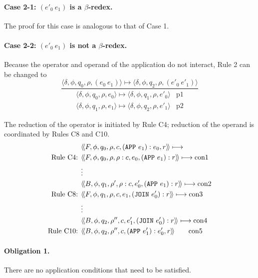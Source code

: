 \paragraph{Case 2-1: \((e'_0\ e_1)\) is a \(\beta\)-redex.}
The proof for this case is analogous to that of Case 1.


\paragraph{Case 2-2: \((e'_0\ e_1)\) is not a \(\beta\)-redex.}
Because the operator and operand of the application do not interact, Rule 2 can
be changed to
\[
\frac{
  \langle \delta,\phi,q_0,\rho,(e_0\ e_1)\rangle
  \longmapsto
  \langle \delta,\phi,q_2,\rho,(e'_0\ e'_1)\rangle
}{
  \begin{array}{ll}
  \langle \delta,\phi,q_0,\rho,e_0\rangle
  \longmapsto
  \langle \delta,\phi,q_1,\rho,e'_0\rangle
  & \mathrm{p1}\\
  \langle \delta,\phi,q_1,\rho,e_1\rangle
  \longmapsto
  \langle \delta,\phi,q_2,\rho,e'_1\rangle
  & \mathrm{p2}
  \end{array}
}
\]

The reduction of the operator is initiated by Rule C4; reduction of the operand
is coordinated by Rules C8 and C10.
\begin{align*}
&\langle\!\langle F,\phi,q_0,\rho,c,(\THOR{APP}\ e_1):e_0,r\rangle\!\rangle
\longmapsto\\
\text{Rule C4: }&
\langle\!\langle F,\phi,q_0,\rho,\rho:c,e_0,(\THOR{APP}\ e_1):r\rangle\!\rangle
\longmapsto \mathrm{con1}\\
&\vdots\\
&\langle\!\langle B,\phi,q_1,\rho',\rho:c,e'_0,(\THOR{APP}\ e_1):r\rangle\!\rangle
\longmapsto \mathrm{con2}\\
\text{Rule C8: }&
\langle\!\langle F,\phi,q_1,\rho,c,e_1,(\THOR{JOIN}\ e'_0):r\rangle\!\rangle
\longmapsto \mathrm{con3}\\
&\vdots\\
&\langle\!\langle B,\phi,q_2,\rho'',c,e'_1,(\THOR{JOIN}\ e'_0):r\rangle\!\rangle
\longmapsto \mathrm{con4}\\
\text{Rule C10: }&
\langle\!\langle B,\phi,q_2,\rho'',c,(\THOR{APP}\ e'_1):e'_0,r\rangle\!\rangle
\qquad \mathrm{con5}
\end{align*}

\paragraph{Obligation 1.} There are no application conditions that need to be
satisfied.

